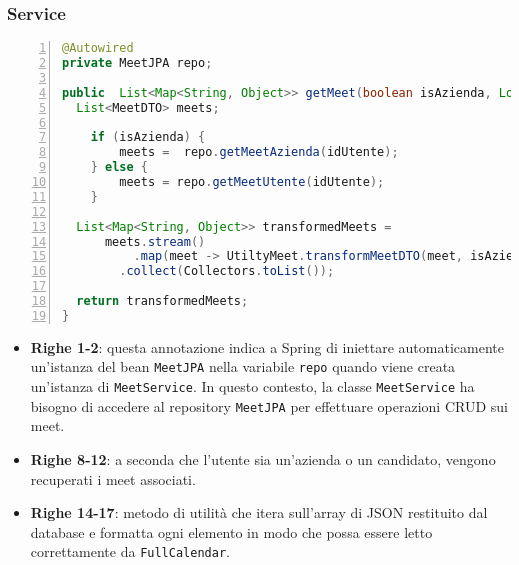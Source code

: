 \subsubsection{Service}
\begin{lstlisting}[language=java, frame=lines, basicstyle=\ttfamily\scriptsize, numbers=left]
@Autowired
private MeetJPA repo;

public  List<Map<String, Object>> getMeet(boolean isAzienda, Long idUtente) {
  List<MeetDTO> meets;

	if (isAzienda) {
		meets =  repo.getMeetAzienda(idUtente);
	} else {
		meets = repo.getMeetUtente(idUtente);
	}

  List<Map<String, Object>> transformedMeets = 
      meets.stream()
		  .map(meet -> UtiltyMeet.transformMeetDTO(meet, isAzienda))
        .collect(Collectors.toList());

  return transformedMeets;
}
\end{lstlisting}
\begin{itemize}
    \item \textbf{Righe 1-2}: questa annotazione indica a Spring di iniettare automaticamente un'istanza del bean \texttt{MeetJPA}
    nella variabile \texttt{repo} quando viene creata un'istanza di \texttt{MeetService}. \cite{AutoWiredSpring}
    In questo contesto, la classe \texttt{MeetService} ha bisogno di accedere al repository \texttt{MeetJPA} per effettuare
    operazioni CRUD sui meet.

    \item \textbf{Righe 8-12}: a seconda che l'utente sia un'azienda o un candidato, vengono recuperati i meet associati.
    
    \item \textbf{Righe 14-17}: metodo di utilità che itera sull'array di JSON restituito dal
    database e formatta ogni elemento in modo che possa essere letto correttamente da \texttt{FullCalendar}.
\end{itemize}